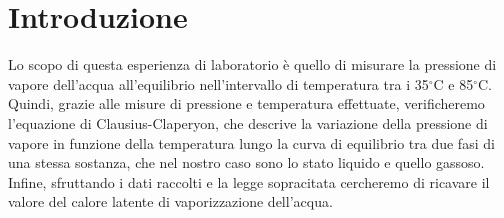 \section{Introduzione}

Lo scopo di questa esperienza di laboratorio è quello di misurare la pressione
di vapore dell'acqua all'equilibrio nell'intervallo di temperatura tra i 35$^\circ$C
e 85$^\circ$C. Quindi, grazie alle misure di pressione e temperatura effettuate, verificheremo
l'equazione di Clausius-Claperyon, che descrive la variazione della pressione di vapore
in funzione della temperatura lungo la curva di equilibrio tra due fasi di una stessa sostanza,
che nel nostro caso sono lo stato liquido e quello gassoso.
Infine, sfruttando i dati raccolti e la legge sopracitata cercheremo di ricavare il valore del calore latente di vaporizzazione dell'acqua.